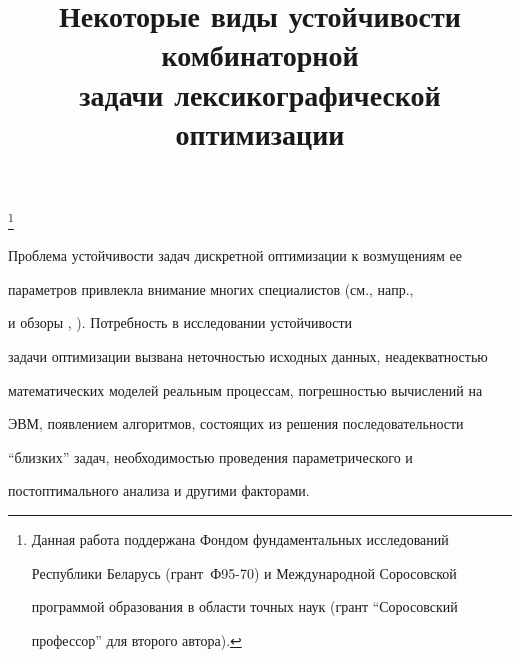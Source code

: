 

\title{Некоторые виды устойчивости комбинаторной\\ 


задачи лексикографической оптимизации} 


 


\thanks{Данная работа поддержана Фондом фундаментальных исследований 


Республики Беларусь (грант \No\,Ф95-70) и Международной Соросовской 


программой образования в области точных наук (грант ``Соросовский 


профессор'' для второго автора).} 


\date{} 




 


\pagestyle{plain} %


 


 




 


\maketitle 


\label{begin} 


 


Проблема устойчивости задач дискретной оптимизации к возмущениям ее 


параметров привлекла внимание многих специалистов (см., напр., \cite{1} 


и обзоры \cite{2}, \cite{3}). Потребность в исследовании устойчивости 


задачи оптимизации вызвана неточностью исходных данных, неадекватностью 


математических моделей реальным процессам, погрешностью вычислений на 


ЭВМ, появлением алгоритмов, состоящих из решения последовательности 


``близких'' задач, необходимостью проведения параметрического и 


постоптимального анализа и другими факторами. 


